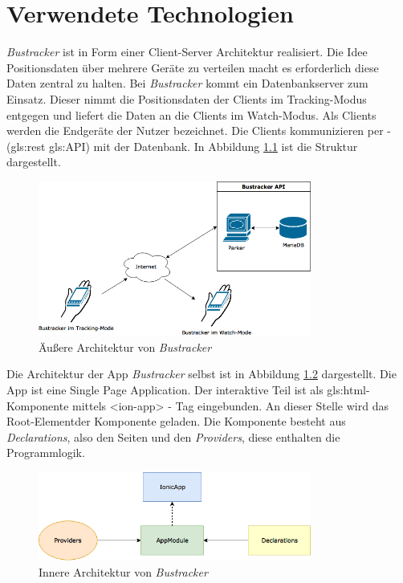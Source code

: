 \chapter{Verwendete Technologien}
\label{Verwendete Technologien}
\emph{Bustracker} ist in Form einer Client-Server Architektur realisiert.  Die Idee Positionsdaten über mehrere Geräte zu verteilen macht es erforderlich diese Daten zentral zu halten. Bei \emph{Bustracker} kommt ein Datenbankserver zum Einsatz. Dieser nimmt die Positionsdaten der Clients im Tracking-Modus entgegen und liefert die Daten an die Clients im Watch-Modus. Als Clients werden die Endgeräte der Nutzer bezeichnet. Die Clients kommunizieren per  -  (\gls{gls:rest} \gls{gls:API}) mit der Datenbank. In Abbildung \ref{fig:CSArchitektur} ist die Struktur dargestellt. 

\begin{figure}[htbp] 
	\centering
	\includegraphics[width=0.8\textwidth]{images/CSArchitektur.png} 
	\caption{Äußere Architektur von \emph{Bustracker}}
	\label{fig:CSArchitektur}
\end{figure}

Die Architektur der App \emph{Bustracker} selbst ist in Abbildung \ref{fig:innereArchitektur} dargestellt. Die App ist eine \glqq Single Page Application\grqq{}. Der interaktive Teil ist als \gls{gls:html}-Komponente mittels <ion-app> - Tag eingebunden. An dieser Stelle wird das \glqq Root-Element\grqq der Komponente geladen. Die Komponente besteht aus \emph{Declarations}, also den Seiten und den \emph{Providers}, diese enthalten die Programmlogik.

\begin{figure}[htbp] 
	\centering
	\includegraphics[width=0.8\textwidth]{images/AppArchitektur.png} 
	\caption{Innere Architektur von \emph{Bustracker}}
	\label{fig:innereArchitektur}
\end{figure}

